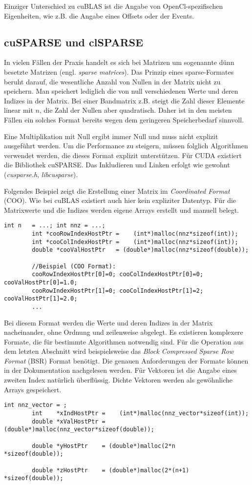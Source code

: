 		Einziger Unterschied zu cuBLAS ist die Angabe von OpenCl-spezifischen Eigenheiten, wie z.B. die Angabe eines Offsets oder	
der Events.
		
		\subsection{cuSPARSE und clSPARSE}
		In vielen Fällen der Praxis handelt es sich bei Matrizen um sogenannte dünn besetzte Matrizen (engl. \textit{sparse matrices}). Das Prinzip eines sparse-Formates beruht darauf, die wesentliche Anzahl von Nullen in der Matrix nicht zu speichern. Man speichert lediglich die von null verschiedenen Werte und deren Indizes in der Matrix. Bei einer Bandmatrix z.B. steigt die Zahl dieser Elemente linear mit $n$, die Zahl der Nullen aber quadratisch. Daher ist in den meisten Fällen ein solches Format bereits wegen dem geringeren Speicherbedarf sinnvoll. 
		
		Eine Multiplikation mit Null ergibt immer Null und muss nicht explizit ausgeführt werden. Um die Performance zu steigern, müssen folglich Algorithmen verwendet werden, die dieses Format explizit unterstützen. Für CUDA existiert die Bibliothek cuSPARSE. Das Inkludieren und Linken erfolgt wie gewohnt (\textit{cusparse.h}, \textit{libcusparse}).
		
		Folgendes Beispiel zeigt die Erstellung einer Matrix im \textit{Coordinated Format} (COO). Wie bei cuBLAS existiert auch hier kein expliziter Datentyp. Für die Matrixwerte und die Indizes werden eigene Arrays erstellt und manuell belegt.	
		\begin{lstlisting}[caption=cuSPARSE: Matrix erstellen]
		int n   = ...; int nnz = ...;
		int *cooRowIndexHostPtr =    (int*)malloc(nnz*sizeof(int));
		int *cooColIndexHostPtr =    (int*)malloc(nnz*sizeof(int));
		double *cooValHostPtr   = (double*)malloc(nnz*sizeof(double));

		//Beispiel (COO Format): 
		cooRowIndexHostPtr[0]=0; cooColIndexHostPtr[0]=0; cooValHostPtr[0]=1.0;
		cooRowIndexHostPtr[1]=0; cooColIndexHostPtr[1]=2; cooValHostPtr[1]=2.0;
		...		
		\end{lstlisting}

		Bei diesem Format werden die Werte und deren Indizes in der Matrix nacheinander, ohne Ordnung und zeilenweise abgelegt. Es existieren komplexere Formate, die für bestimmte Algorithmen notwendig sind. Für die Operation aus dem letzten Abschnitt wird beispielsweise das \textit{Block Compressed Sparse Row Format} (BSR) Format benötigt. Die genauen Anforderungen der Formate können in der Dokumentation nachgelesen werden. \cite{cusparseDoc}
		Für Vektoren ist die Angabe eines zweiten Index natürlich überflüssig. Dichte Vektoren werden als gewöhnliche Arrays gespeichert.
		\begin{lstlisting}[caption=cuSPARSE: Vector erstellen]
		int nnz_vector = ;
		int    *xIndHostPtr =    (int*)malloc(nnz_vector*sizeof(int));
		double *xValHostPtr = (double*)malloc(nnz_vector*sizeof(double));
    
		double *yHostPtr    = (double*)malloc(2*n       *sizeof(double));
    
		double *zHostPtr    = (double*)malloc(2*(n+1)   *sizeof(double));
		\end{lstlisting}

